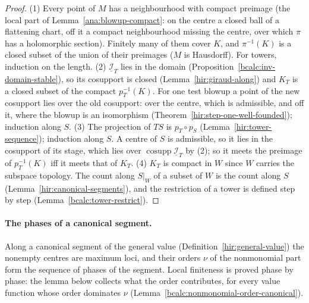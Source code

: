 \begin{proof}
\mixedleanok
(1) Every point of \(M\) has a neighbourhood with compact preimage (the local part of Lemma~\ref{ana:blowup-compact}: on the centre a closed ball of a flattening
chart, off it a compact neighbourhood missing the centre, over which \(\pi\) has a holomorphic section). Finitely many of them cover \(K\), and \(\pi^{-1}(K)\) is a
closed subset of the union of their preimages (\(M\) is Hausdorff). For towers, induction on the length.
(2) \(\underline{\mathcal I}_T\) lies in the domain (Proposition~\ref{bcalc:inv-domain-stable}), so its cosupport is closed (Lemma~\ref{hir:giraud-along}) and
\(K_T\) is a closed subset of the compact \(p_T^{-1}(K)\). For one test blowup a point of the new cosupport lies over the old cosupport: over the centre, which is
admissible, and off it, where the blowup is an isomorphism (Theorem~\ref{hir:step-one-well-founded}); induction along \(S\).
(3) The projection of \(TS\) is \(p_T\circ p_S\) (Lemma~\ref{hir:tower-sequence}); induction along \(S\). A centre of \(S\) is admissible, so it lies in the cosupport of
its stage, which lies over \(\operatorname{cosupp}\underline{\mathcal I}_T\) by (2); so it meets the preimage of \(p_T^{-1}(K)\) iff it meets that of \(K_T\).
(4) \(K_T\) is compact in \(W\) since \(W\) carries the subspace topology. The count along \(S|_W\) of a subset of \(W\) is the count along \(S\)
(Lemma~\ref{hir:canonical-segments}), and the restriction of a tower is defined step by step (Lemma~\ref{bcalc:tower-restrict}).
\end{proof}

\paragraph{The phases of a canonical segment.} Along a canonical segment of the general value (Definition~\ref{hir:general-value}) the nonempty
centres are maximum loci, and their orders \(\nu\) of the nonmonomial part form the sequence of phases of the segment. Local finiteness is proved phase by
phase: the lemma below collects what the order contributes, for every value function whose order dominates \(\nu\)
(Lemma~\ref{bcalc:nonmonomial-order-canonical}).

